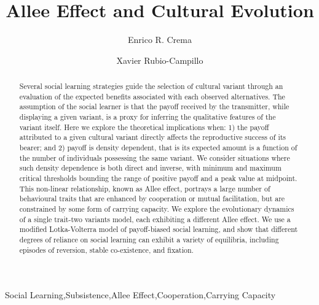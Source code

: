 \documentclass[review,authoryear]{elsarticle}
\begin{document}
\begin{frontmatter}

\title{Allee Effect and Cultural Evolution}


\author[label1,label2]{Enrico R. Crema}
\author[label3]{Xavier Rubio-Campillo}

\address[label1]{CaSEs - Complexity and Socio-Ecological Dynamics Research Group, Barcelona}
\address[label2]{UCL Institute of Archaeology}
\address[label3]{BSC - Barcelona Supercomputing Center}



\begin{abstract}
Several social learning strategies guide the selection of cultural variant through an evaluation of the expected benefits associated with each observed alternatives. The assumption of the social learner is that the payoff received by the transmitter, while displaying a given variant, is a proxy for  inferring the qualitative features of the variant itself. Here we explore the theoretical implications when: 1) the payoff attributed to a given cultural variant directly affects the reproductive success of its bearer;  and 2) payoff is density dependent, that is its expected amount is a function of the number of individuals possessing the same variant. We consider situations where such density dependence is both direct and inverse, with minimum and maximum critical thresholds bounding the range of positive payoff and a peak value at midpoint. This non-linear relationship, known as Allee effect, portrays a large number of behavioural traits that are enhanced by cooperation or mutual facilitation, but are  constrained by some form of carrying capacity.  We explore the evolutionary dynamics of a single trait-two variants model, each exhibiting a different Allee effect. We use a modified Lotka-Volterra model of payoff-biased social learning, and show that different degrees of reliance on social learning can exhibit a variety of equilibria, including episodes of reversion, stable co-existence, and fixation.

\end{abstract}

\begin{keyword}
Social Learning\sep Subsistence\sep Allee Effect\sep Cooperation\sep Carrying Capacity
\end{keyword}

\end{frontmatter}
\end{document}
